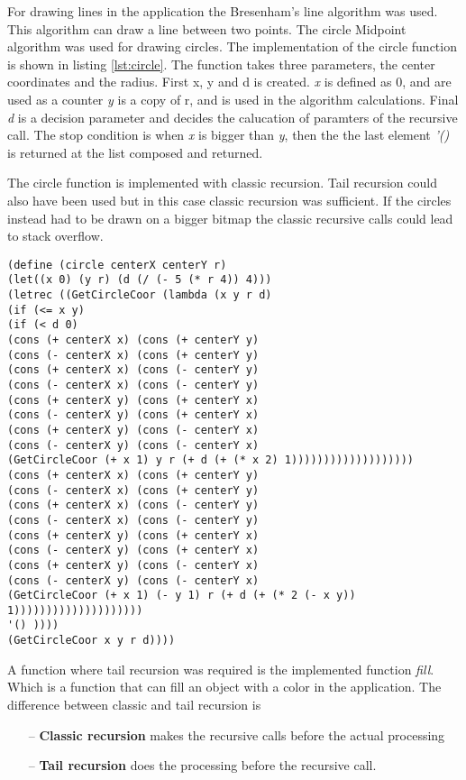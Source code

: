 For drawing lines in the application the Bresenham’s line algorithm was used. This algorithm can draw a line between two points. The circle Midpoint algorithm was used for drawing circles. The implementation of the circle function is shown in listing \ref{lst:circle}. The function takes three parameters, the center coordinates and the radius. First x, y and d is created. \emph{x} is defined as 0, and are used as a counter \emph{y} is a copy of r, and is used in the algorithm calculations. Final \emph{d} is  a decision parameter and decides the calucation of paramters of the recursive call. The stop condition is when \emph{x} is bigger than \emph{y}, then the the last element \emph{'()} is returned at the list composed and returned.

The circle function is implemented with classic recursion. Tail recursion could also have been used but in this case classic recursion was sufficient. If the circles instead had to be drawn on a bigger bitmap the classic recursive calls could lead to stack overflow.


\begin{lstlisting}[caption={Scheme function circle}, label=lst:circle]
(define (circle centerX centerY r)
(let((x 0) (y r) (d (/ (- 5 (* r 4)) 4)))
(letrec ((GetCircleCoor (lambda (x y r d)
(if (<= x y)
(if (< d 0)    
(cons (+ centerX x) (cons (+ centerY y)                                                
(cons (- centerX x) (cons (+ centerY y)
(cons (+ centerX x) (cons (- centerY y)         
(cons (- centerX x) (cons (- centerY y)
(cons (+ centerX y) (cons (+ centerY x)
(cons (- centerX y) (cons (+ centerY x)
(cons (+ centerX y) (cons (- centerY x)
(cons (- centerX y) (cons (- centerY x)  
(GetCircleCoor (+ x 1) y r (+ d (+ (* x 2) 1)))))))))))))))))))
(cons (+ centerX x) (cons (+ centerY y)                                                
(cons (- centerX x) (cons (+ centerY y)
(cons (+ centerX x) (cons (- centerY y)         
(cons (- centerX x) (cons (- centerY y)
(cons (+ centerX y) (cons (+ centerY x)
(cons (- centerX y) (cons (+ centerY x)
(cons (+ centerX y) (cons (- centerY x)
(cons (- centerX y) (cons (- centerY x)  
(GetCircleCoor (+ x 1) (- y 1) r (+ d (+ (* 2 (- x y)) 1))))))))))))))))))))
'() ))))
(GetCircleCoor x y r d))))   
\end{lstlisting}

A function where tail recursion was required is the implemented function \emph{fill}. Which is a function that can fill an object with a color in the application. The difference between classic and tail recursion is
\begin{itemize}
	\item[--] \textbf{Classic recursion} makes the recursive calls before the actual processing
	\item[--] \textbf{Tail recursion} does the processing before the recursive call.  
\end{itemize}

